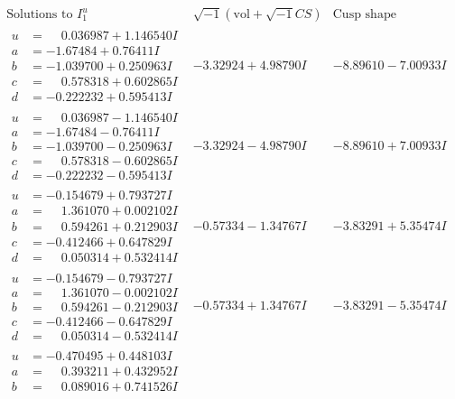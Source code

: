 \documentclass[1p]{elsarticle_modified}
\theoremstyle{definition}
\newcommand{\I}{\sqrt{-1}}
\begin{document}
$$\begin{array}{c|c|c}  
\text{Solutions to }I^u_{1}& \I (\text{vol} + \sqrt{-1}CS) & \text{Cusp shape}\\
 \hline 
\begin{aligned}
u &= \phantom{-}0.036987 + 1.146540 I \\
a &= -1.67484 + 0.76411 I \\
b &= -1.039700 + 0.250963 I \\
c &= \phantom{-}0.578318 + 0.602865 I \\
d &= -0.222232 + 0.595413 I\end{aligned}
 & -3.32924 + 4.98790 I & -8.89610 - 7.00933 I \\ \hline\begin{aligned}
u &= \phantom{-}0.036987 - 1.146540 I \\
a &= -1.67484 - 0.76411 I \\
b &= -1.039700 - 0.250963 I \\
c &= \phantom{-}0.578318 - 0.602865 I \\
d &= -0.222232 - 0.595413 I\end{aligned}
 & -3.32924 - 4.98790 I & -8.89610 + 7.00933 I \\ \hline\begin{aligned}
u &= -0.154679 + 0.793727 I \\
a &= \phantom{-}1.361070 + 0.002102 I \\
b &= \phantom{-}0.594261 + 0.212903 I \\
c &= -0.412466 + 0.647829 I \\
d &= \phantom{-}0.050314 + 0.532414 I\end{aligned}
 & -0.57334 - 1.34767 I & -3.83291 + 5.35474 I \\ \hline\begin{aligned}
u &= -0.154679 - 0.793727 I \\
a &= \phantom{-}1.361070 - 0.002102 I \\
b &= \phantom{-}0.594261 - 0.212903 I \\
c &= -0.412466 - 0.647829 I \\
d &= \phantom{-}0.050314 - 0.532414 I\end{aligned}
 & -0.57334 + 1.34767 I & -3.83291 - 5.35474 I \\ \hline\begin{aligned}
u &= -0.470495 + 0.448103 I \\
a &= \phantom{-}0.393211 + 0.432952 I \\
b &= \phantom{-}0.089016 + 0.741526 I \\

\end{aligned}
\end{array}$$
\end{document}
